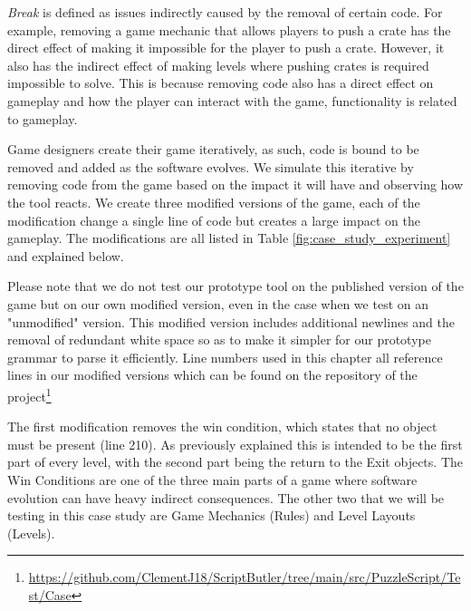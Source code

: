 \textit{Break} is defined as issues indirectly caused by the removal of certain code. For example, removing a game mechanic that allows players to push a crate has the direct effect of making it impossible for the player to push a crate. However, it also has the indirect effect of making levels where pushing crates is required impossible to solve. This is because removing code also has a direct effect on gameplay and how the player can interact with the game, functionality is related to gameplay. 

Game designers create their game iteratively, as such, code is bound to be removed and added as the software evolves. We simulate this iterative by removing code from the game based on the impact it will have and observing how the tool reacts. We create three modified versions of the game, each of the modification change a single line of code but creates a large impact on the gameplay. The modifications are all listed in Table \ref{fig:case_study_experiment} and explained below.


Please note that we do not test our prototype tool on the published version of the game but on our own modified version, even in the case when we test on an "unmodified" version. This modified version includes additional newlines and the removal of redundant white space so as to make it simpler for our prototype grammar to parse it efficiently. Line numbers used in this chapter all reference lines in our modified versions which can be found on the repository of the project\footnote{\url{https://github.com/ClementJ18/ScriptButler/tree/main/src/PuzzleScript/Test/Case}}


The first modification removes the win condition, which states that no object must be present (line 210). As previously explained this is intended to be the first part of every level, with the second part being the return to the Exit objects. The Win Conditions are one of the three main parts of a game where software evolution can have heavy indirect consequences. The other two that we will be testing in this case study are Game Mechanics (Rules) and Level Layouts (Levels).


